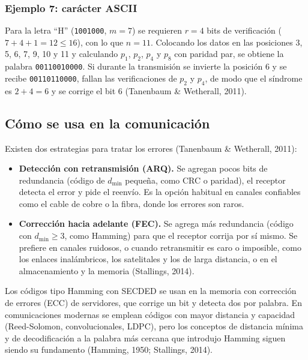 \documentclass[12pt,letterpaper]{article}
\newcommand{\bits}[1]{\texttt{#1}}
\begin{document}
\subsubsection*{Ejemplo 7: carácter ASCII}
Para la letra ``H'' (\bits{1001000}, $m=7$) se requieren $r=4$ bits de verificación ($7+4+1 = 12 \le 16$), con lo que $n = 11$. Colocando los datos en las posiciones 3, 5, 6, 7, 9, 10 y 11 y calculando $p_1$, $p_2$, $p_4$ y $p_8$ con paridad par, se obtiene la palabra \bits{00110010000}. Si durante la transmisión se invierte la posición 6 y se recibe \bits{00110110000}, fallan las verificaciones de $p_2$ y $p_4$, de modo que el síndrome es $2+4 = 6$ y se corrige el bit 6 (Tanenbaum \& Wetherall, 2011).

\subsection{Cómo se usa en la comunicación}
Existen dos estrategias para tratar los errores (Tanenbaum \& Wetherall, 2011):
\begin{itemize}[itemsep=2pt]
\item \textbf{Detección con retransmisión (ARQ).} Se agregan pocos bits de redundancia (código de $d_{\min}$ pequeña, como CRC o paridad), el receptor detecta el error y pide el reenvío. Es la opción habitual en canales confiables como el cable de cobre o la fibra, donde los errores son raros.
\item \textbf{Corrección hacia adelante (FEC).} Se agrega más redundancia (código con $d_{\min} \ge 3$, como Hamming) para que el receptor corrija por sí mismo. Se prefiere en canales ruidosos, o cuando retransmitir es caro o imposible, como los enlaces inalámbricos, los satelitales y los de larga distancia, o en el almacenamiento y la memoria (Stallings, 2014).
\end{itemize}
Los códigos tipo Hamming con SECDED se usan en la memoria con corrección de errores (ECC) de servidores, que corrige un bit y detecta dos por palabra. En comunicaciones modernas se emplean códigos con mayor distancia y capacidad (Reed-Solomon, convolucionales, LDPC), pero los conceptos de distancia mínima y de decodificación a la palabra más cercana que introdujo Hamming siguen siendo su fundamento (Hamming, 1950; Stallings, 2014).
\end{document}
